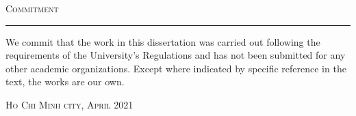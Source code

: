 \thispagestyle{empty}
\vspace*{3cm}
\noindent\Huge\textsc{Commitment}\\
\normalsize
\noindent\rule[2pt]{\textwidth}{0.8pt}
\hspace*{5cm}

We commit that the work in this dissertation was carried out following the requirements of the University’s Regulations and has not been submitted for any other academic organizations. Except where indicated by specific reference in the text, the works are our own.
	
	\hfill \textsc{Ho Chi Minh city, April 2021}
	
\cleardoublepage
